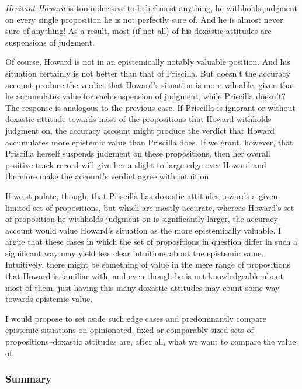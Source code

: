 \documentclass[12pt,numbers=noenddot]{scrartcl}
\begin{document}
\begin{description}
    \item \emph{Hesitant Howard} is too indecisive to belief most anything, he withholds judgment on every single proposition he is not perfectly sure of. And he is almost never sure of anything! As a result, most (if not all) of his doxastic attitudes are suspensions of judgment.
\end{description}

Of course, Howard is not in an epistemically notably valuable position. And his situation certainly is not better than that of Priscilla. But doesn't the accuracy account produce the verdict that Howard's situation is more valuable, given that he accumulates value for each suspension of judgment, while Priscilla doesn't? The response is analogous to the previous case. If Priscilla is ignorant or without doxastic attitude towards most of the propositions that Howard withholds judgment on, the accuracy account might produce the verdict that Howard accumulates more epistemic value than Priscilla does. If we grant, however, that Priscilla herself suspends judgment on these propositions, then her overall positive track-record will give her a slight to large edge over Howard and therefore make the account's verdict agree with intuition.

If we stipulate, though, that Priscilla has doxastic attitudes towards a given limited set of propositions, but which are mostly accurate, whereas Howard's set of proposition he withholds judgment on is significantly larger, the accuracy account would value Howard's situation as the more epistemically valuable. I argue that these cases in which the set of propositions in question differ in such a significant way may yield less clear intuitions about the epistemic value. Intuitively, there might be something of value in the mere range of propositions that Howard is familiar with, and even though he is not knowledgeable about most of them, just having this many doxastic attitudes may count some way towards epistemic value.

I would propose to set aside such edge cases and predominantly compare epistemic situations on opinionated, fixed or comparably-sized sets of propositions–doxastic attitudes are, after all, what we want to compare the value of.

\subsubsection{Summary}
\end{document}
